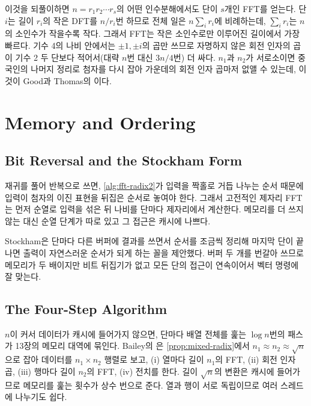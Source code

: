 이것을 되풀이하면 $n=r_1r_2\cdots r_s$의 어떤 인수분해에서도 단이 $s$개인 FFT를 얻는다. 단 $i$는 길이 $r_i$의 작은 DFT를 $n/r_i$번 하므로 전체 일은 $n\sum_ir_i$에 비례하는데, $\sum_ir_i$는 $n$의 소인수가 작을수록 작다. 그래서 FFT는 작은 소인수로만 이루어진 길이에서 가장 빠르다. 기수 4의 나비 안에서는 $\pm1,\pm i$의 곱만 쓰므로 자명하지 않은 회전 인자의 곱이 기수 2 두 단보다 적어서(대략 $n$번 대신 $3n/4$번) 더 싸다. $n_1$과 $n_2$가 서로소이면 중국인의 나머지 정리로 첨자를 다시 잡아 가운데의 회전 인자 곱마저 없앨 수 있는데, 이것이 Good과 Thomas의 이다\cite{good1958,duhamel1990}.

\section{Memory and Ordering}
\label{sec:fft-memory}

\subsection{Bit Reversal and the Stockham Form}

재귀를 풀어 반복으로 쓰면, \cref{alg:fft-radix2}가 입력을 짝홀로 거듭 나누는 순서 때문에 입력이 첨자의 이진 표현을 뒤집은 순서로 놓여야 한다. 그래서 고전적인 제자리 FFT는 먼저  순열로 입력을 섞은 뒤 나비를 단마다 제자리에서 계산한다. 메모리를 더 쓰지 않는 대신 순열 단계가 따로 있고 그 접근은 캐시에 나쁘다.

Stockham은 단마다 다른 버퍼에 결과를 쓰면서 순서를 조금씩 정리해 마지막 단이 끝나면 출력이 자연스러운 순서가 되게 하는 꼴을 제안했다\cite{stockham1966}. 버퍼 두 개를 번갈아 쓰므로 메모리가 두 배이지만 비트 뒤집기가 없고 모든 단의 접근이 연속이어서 벡터 명령에 잘 맞는다\cite{vanloan1992}.

\subsection{The Four-Step Algorithm}

$n$이 커서 데이터가 캐시에 들어가지 않으면, 단마다 배열 전체를 훑는 $\log n$번의 패스가 13장의 메모리 대역에 묶인다. Bailey의 은 \cref{prop:mixed-radix}에서 $n_1\approx n_2\approx\sqrt n$으로 잡아 데이터를 $n_1\times n_2$ 행렬로 보고, (i) 열마다 길이 $n_1$의 FFT, (ii) 회전 인자 곱, (iii) 행마다 길이 $n_2$의 FFT, (iv) 전치를 한다\cite{bailey1990fft}. 길이 $\sqrt n$의 변환은 캐시에 들어가므로 메모리를 훑는 횟수가 상수 번으로 준다. 열과 행이 서로 독립이므로 여러 스레드에 나누기도 쉽다.

